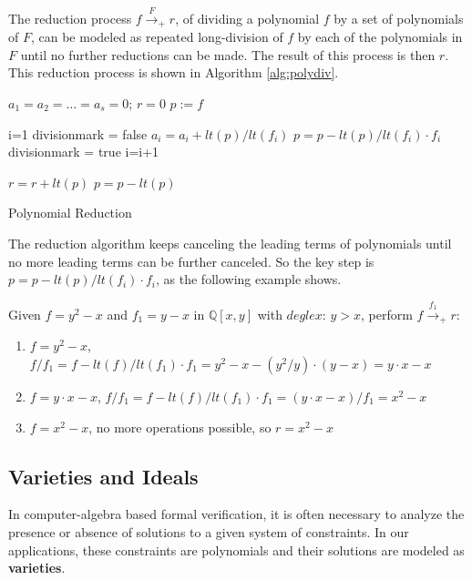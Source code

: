 The reduction process $f\stackrel{F}{\textstyle\longrightarrow}_+r$, of 
dividing a polynomial $f$ by a set of polynomials of $F$, can be modeled as
repeated long-division of $f$ by each of the polynomials in $F$ until no
further reductions can be made. The result of this process is then $r$.
This reduction process is shown in Algorithm \ref{alg:polydiv}.

\begin{algorithm}[H]
\SetAlgoNoLine
\LinesNumbered
 
 $a_{1}=a_{2}=\dots=a_{s}=0$; $r=0$\;
 $p:=f$\;
 
 {
	i=1\;
	divisionmark = false\;
	{
		{
			$a_{i}=a_{i}+lt(p)/lt(f_{i})$\;
			$p=p-lt(p)/lt(f_{i}) \cdot f_{i}$\;
			divisionmark = true\;
		}
		{
			i=i+1\;
		}
	}
	
	{
		$r=r+lt(p)$\;
		$p=p-lt(p)$\;
	}

 }
\caption{Polynomial Reduction}\label{alg:polydiv}
\end{algorithm}

The reduction algorithm keeps canceling the leading terms of polynomials 
until no more leading terms can be further canceled.
So the key step is $p=p-lt(p)/lt(f_{i}) \cdot f_{i}$, as the following 
example shows.
\begin{Example}
Given $f = y^{2}-x$ and $f_{1} = y - x$ in $\mathbb{Q}[x,y]$ with $deglex$: 
$y>x$, perform $f\stackrel{f_1}{\textstyle\longrightarrow}_+r$:

\begin{enumerate}
\item $f=y^{2}-x$, $f/f_{1}=f-lt(f)/lt(f_{1}) \cdot f_{1}=y^{2}-x-(y^{2} /y) \cdot (y-x)=y\cdot x-x$
\item $f=y\cdot x-x$, $f/f_{1}=f-lt(f)/lt(f_{1}) \cdot f_{1}=(y\cdot x-x)/f_{1}=x^{2}-x$
\item $f=x^{2}-x$, no more operations possible, so $r=x^{2}-x$
\end{enumerate}
\end{Example}

\subsection{Varieties and Ideals}
In computer-algebra based formal verification,
it is often necessary to analyze the presence 
or absence of solutions to a given system of constraints.
In our applications, these constraints are polynomials and their solutions 
are modeled as {\bf varieties}.

